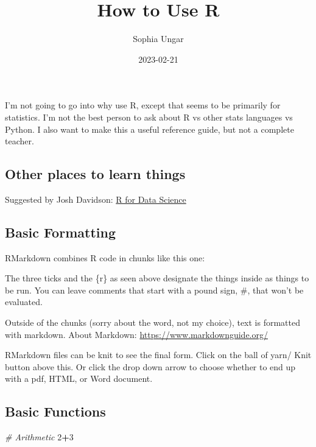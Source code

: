 \documentclass[
]{article}
\title{How to Use R}
\author{Sophia Ungar}
\date{2023-02-21}
\newenvironment{Shaded}{\begin{snugshade}}{\end{snugshade}}
\newcommand{\CommentTok}[1]{\textcolor[rgb]{0.56,0.35,0.01}{\textit{#1}}}
\newcommand{\DecValTok}[1]{\textcolor[rgb]{0.00,0.00,0.81}{#1}}
\newcommand{\SpecialCharTok}[1]{\textcolor[rgb]{0.81,0.36,0.00}{\textbf{#1}}}
\begin{document}
\maketitle

I'm not going to go into why use R, except that seems to be primarily
for statistics. I'm not the best person to ask about R vs other stats
languages vs Python. I also want to make this a useful reference guide,
but not a complete teacher.

\hypertarget{other-places-to-learn-things}{%
\subsection{Other places to learn
things}\label{other-places-to-learn-things}}

Suggested by Josh Davidson:
\href{https://r4ds.hadley.nz/data-visualize}{R for Data Science}

\hypertarget{basic-formatting}{%
\subsection{Basic Formatting}\label{basic-formatting}}

RMarkdown combines R code in chunks like this one:

The three ticks and the \{r\} as seen above designate the things inside
as things to be run. You can leave comments that start with a pound
sign, \#, that won't be evaluated.

Outside of the chunks (sorry about the word, not my choice), text is
formatted with markdown. About Markdown:
\url{https://www.markdownguide.org/}

RMarkdown files can be knit to see the final form. Click on the ball of
yarn/ Knit button above this. Or click the drop down arrow to choose
whether to end up with a pdf, HTML, or Word document.

\hypertarget{basic-functions}{%
\subsection{Basic Functions}\label{basic-functions}}

\begin{Shaded}
\begin{Highlighting}[]
\CommentTok{\# Arithmetic}
\DecValTok{2}\SpecialCharTok{+}\DecValTok{3}
\end{Highlighting}
\end{Shaded}
\end{document}
